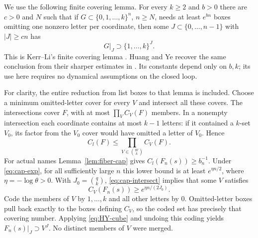 \documentclass[11pt,reqno]{amsart}
\numberwithin{equation}{section}
\theoremstyle{definition}
\begin{document}
We use the following finite covering lemma. For every
$k\ge2$ and $b>0$ there are $c>0$ and $N$ such that if
$G\subset\{0,1,\ldots,k\}^n$, $n\ge N$, needs at least
$e^{bn}$ boxes omitting one nonzero letter per coordinate, then some
$J\subset\{0,\ldots,n-1\}$ with $|J|\ge cn$ has
\begin{equation}\label{eq:HY-cube}
 G|_J\supset\{1,\ldots,k\}^{J}.
\end{equation}
This is Kerr--Li's finite covering lemma
\cite[Lemma~3.3]{KL2007}. Huang and Ye recover the same conclusion
from their sharper estimates in \cite[Lemma~4.1 and Remark~4.2,
pp.~1701--1705]{HuangYe2009}. Its constants depend only on $b,k$;
its use here requires no dynamical assumptions on the closed loop.

For clarity, the entire reduction from list boxes to that lemma is
included. Choose a minimum omitted-letter cover for every $V$ and
intersect all these covers. The intersections cover $F$, with at most
$\prod_V C_V(F)$ members. In a nonempty intersection each coordinate
contains at most $k-1$ letters: if it contained a $k$-set $V_0$, its
factor from the $V_0$ cover would have omitted a letter of $V_0$.
Hence
\begin{equation}\label{eq:cap-intersect}
 C_l(F)\le\prod_{V\in\binom Wk}C_V(F).
\end{equation}
For actual names Lemma~\ref{lem:fiber-cap} gives
$C_l(F_n(s))\ge b_n^{-1}$. Under \eqref{eq:cap-exp}, for all
sufficiently large $n$ this lower bound is at least
$e^{\eta n/2}$, where $\eta=-\log\theta>0$. With
$J_0=\binom qk$, \eqref{eq:cap-intersect} implies that some $V$
satisfies
\[
 C_V(F_n(s))\ge e^{\eta n/(2J_0)}.
\]
Code the members of $V$ by $1,\ldots,k$ and all other letters by
$0$. Omitted-letter boxes pull back exactly to the boxes defining
$C_V$, so the coded set has precisely that covering number. Applying
\eqref{eq:HY-cube} and undoing this coding yields
$F_n(s)|_J\supset V^J$. No distinct members of $V$ were merged.
\end{document}
